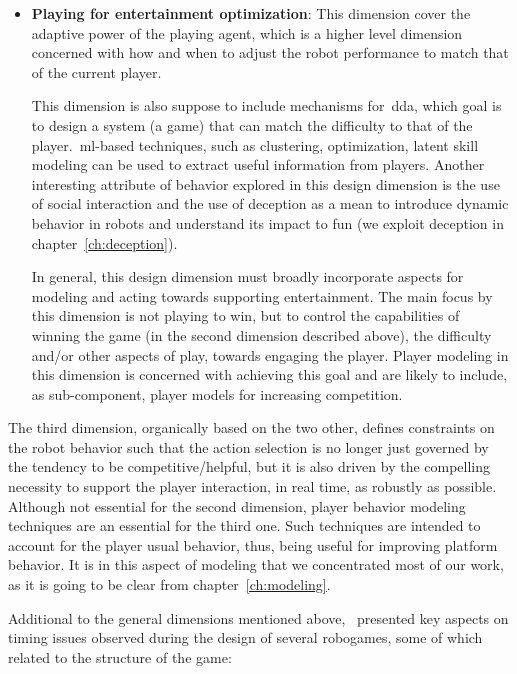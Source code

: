 \begin{itemize}[leftmargin=*,labelsep=5.8mm]
\item \textbf{Playing for entertainment optimization}: This dimension cover the adaptive power of the playing agent, which is a higher level dimension concerned with how and when to adjust the robot performance to match that of the current player. 

This dimension is also suppose to include mechanisms for~\gls{dda}, which goal is to design a system (a game) that can match the difficulty to that of the player.~\gls{ml}-based techniques, such as clustering, optimization, latent skill modeling can be used to extract useful information from players. Another interesting attribute of behavior explored in this design dimension is the use of social interaction and the use of deception as a mean to introduce dynamic behavior in robots and understand its impact to fun (we exploit deception in chapter~\ref{ch:deception}).

In general, this design dimension must broadly incorporate aspects for modeling and acting towards supporting entertainment. The main focus by this dimension is not playing to win, but to control the capabilities of winning the game (in the second dimension described above), \ie the difficulty and/or other aspects of play, towards engaging the player. Player modeling in this dimension is concerned with achieving this goal and are likely to include, as sub-component, player models for increasing competition.
\end{itemize}

The third dimension, organically based on the two other, defines constraints on the robot behavior such that the action selection is no longer just governed by the tendency to be competitive/helpful, but it is also driven by the compelling necessity to support the player interaction, in real time, as robustly as possible. Although not essential for the second dimension, player behavior modeling techniques are an essential for the third one. Such techniques are intended to account for the player usual behavior, thus, being useful for improving platform behavior. It is in this aspect of modeling that we concentrated most of our work, as it is going to be clear from chapter~\ref{ch:modeling}.

Additional to the general dimensions mentioned above,~\cite{bonarini_timing_2014} presented key aspects on timing issues observed during the design of several robogames, some of which related to the structure of the game:

